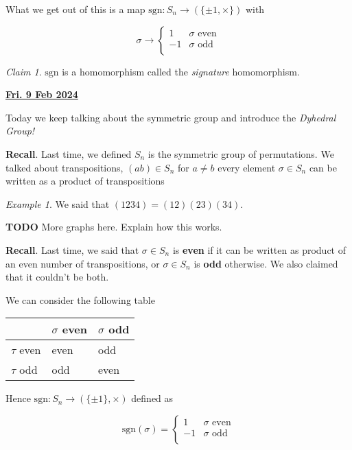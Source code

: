 \documentclass[12pt]{article}
\renewcommand{\date}[1]{\underline{\bf #1}}
\def\sgn{\text{sgn}}
\def\sgn{\text{sgn}}
\def\TODO{\color{red}\textbf{TODO}\color{black}}
\theoremstyle{remark}
\theoremstyle{remark}
\newtheorem{claim}{Claim}
\theoremstyle{remark}
\newtheorem{example}{Example}
\theoremstyle{remark}
\theoremstyle{remark}
\begin{document}
What we get out of this is a map $\sgn: S_n \to (\{\pm 1, \times\})$ with

\[
  \sigma \to \begin{cases}
    1 & \sigma \text{ even} \\
    -1 & \sigma \text{ odd} \\
  \end{cases}
\]

\begin{claim}
  $\sgn$ is a homomorphism called the {\it signature} homomorphism.
\end{claim}

\date{Fri. 9 Feb 2024}

Today we keep talking about the symmetric group and introduce the {\it Dyhedral
Group!}

{\bf Recall}. Last time, we defined $S_n$ is the symmetric group of
permutations. We talked about transpositions, $(ab) \in S_n$ for $a \ne b$ every
element $\sigma \in S_n$ can be written as a product of transpositions

\begin{example}
  We said that $(1234) = (12)(23)(34)$.
\end{example}

\TODO{} More graphs here. Explain how this works.

{\bf Recall}. Last time, we said that $\sigma \in S_n$ is {\bf even} if it can
be written as product of an even number of transpositions, or $\sigma \in S_n$
is {\bf odd} otherwise. We also claimed that it couldn't be both.

We can consider the following table

\begin{center}
  \begin{tabular}[c]{l|l|l}
    & $\sigma$ even & $\sigma$ odd \\
    \hline
    $\tau$ even & even & odd \\
    $\tau$ odd & odd & even \\

    \hline
  \end{tabular}
\end{center}

Hence $\sgn: S_n \to (\{ \pm 1\}, \times)$ defined as

\[
  \sgn(\sigma) = \begin{cases}
    1 & \sigma \text{ even} \\
    -1 & \sigma \text{ odd} \\
  \end{cases}
\]
\end{document}

